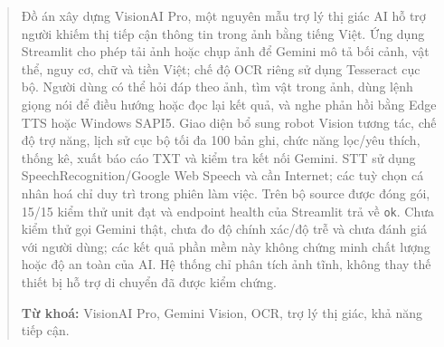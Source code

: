 \begin{abstract}

Đồ án xây dựng VisionAI Pro, một nguyên mẫu trợ lý thị giác AI hỗ trợ người khiếm thị tiếp cận thông tin trong ảnh bằng tiếng Việt. Ứng dụng Streamlit cho phép tải ảnh hoặc chụp ảnh để Gemini mô tả bối cảnh, vật thể, nguy cơ, chữ và tiền Việt; chế độ OCR riêng sử dụng Tesseract cục bộ. Người dùng có thể hỏi đáp theo ảnh, tìm vật trong ảnh, dùng lệnh giọng nói để điều hướng hoặc đọc lại kết quả, và nghe phản hồi bằng Edge TTS hoặc Windows SAPI5. Giao diện bổ sung robot Vision tương tác, chế độ trợ năng, lịch sử cục bộ tối đa 100 bản ghi, chức năng lọc/yêu thích, thống kê, xuất báo cáo TXT và kiểm tra kết nối Gemini. STT sử dụng SpeechRecognition/Google Web Speech và cần Internet; các tuỳ chọn cá nhân hoá chỉ duy trì trong phiên làm việc. Trên bộ source được đóng gói, 15/15 kiểm thử unit đạt và endpoint health của Streamlit trả về \texttt{ok}. Chưa kiểm thử gọi Gemini thật, chưa đo độ chính xác/độ trễ và chưa đánh giá với người dùng; các kết quả phần mềm này không chứng minh chất lượng hoặc độ an toàn của AI. Hệ thống chỉ phân tích ảnh tĩnh, không thay thế thiết bị hỗ trợ di chuyển đã được kiểm chứng.

\vspace{0.8em}
\noindent\textbf{Từ khoá:} VisionAI Pro, Gemini Vision, OCR, trợ lý thị giác, khả năng tiếp cận.

\end{abstract}
